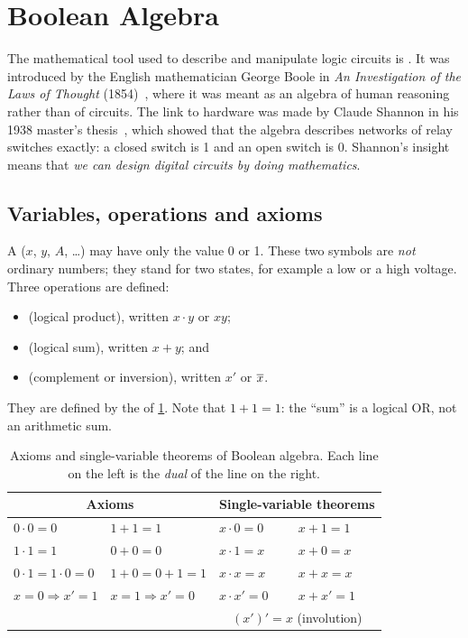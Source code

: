 \section{Boolean Algebra}\label{sec:boolean}
The mathematical tool used to describe and manipulate logic circuits is . It was introduced by the English mathematician George Boole in \emph{An Investigation of the Laws of Thought} (1854)~\cite{boole1854}, where it was meant as an algebra of human reasoning rather than of circuits. The link to hardware was made by Claude Shannon in his 1938 master's thesis~\cite{shannon1938}, which showed that the algebra describes networks of relay switches exactly: a closed switch is 1 and an open switch is 0. Shannon's insight means that \emph{we can design digital circuits by doing mathematics}.

\subsection{Variables, operations and axioms}
A  ($x$, $y$, $A$, \dots) may have only the value 0 or 1. These two symbols are \emph{not} ordinary numbers; they stand for two states, for example a low or a high voltage. Three operations are defined:
\begin{itemize}
  \item {} (logical product), written $x\cdot y$ or $xy$;
  \item {} (logical sum), written $x+y$; and
  \item {} (complement or inversion), written $x'$ or $\overline{x}$.
\end{itemize}
They are defined by the  of \cref{tab:axioms}. Note that $1+1=1$: the ``sum'' is a logical OR, not an arithmetic sum.

\begin{table}[htbp]
\centering
\caption{Axioms and single-variable theorems of Boolean algebra. Each line on the left is the \emph{dual} of the line on the right.}
\label{tab:axioms}
\renewcommand{\arraystretch}{1.2}
\begin{tabular}{@{}ll@{\qquad\qquad}ll@{}}
\toprule
\multicolumn{2}{c}{\textbf{Axioms}} & \multicolumn{2}{c}{\textbf{Single-variable theorems}}\\
\midrule
$0\cdot 0 = 0$ & $1+1 = 1$ & $x\cdot 0 = 0$ & $x+1 = 1$\\
$1\cdot 1 = 1$ & $0+0 = 0$ & $x\cdot 1 = x$ & $x+0 = x$\\
$0\cdot 1 = 1\cdot 0 = 0$ & $1+0 = 0+1 = 1$ & $x\cdot x = x$ & $x+x = x$\\
$x=0 \Rightarrow x'=1$ & $x=1 \Rightarrow x'=0$ & $x\cdot x' = 0$ & $x+x' = 1$\\
 & & \multicolumn{2}{c}{$(x')' = x$ \quad (involution)}\\
\bottomrule
\end{tabular}
\end{table}

